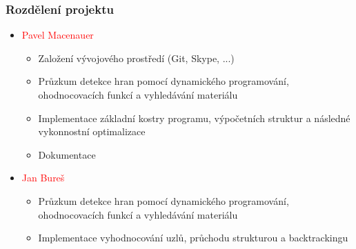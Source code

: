 \documentclass{beamer}
\begin{document}
	
	\begin{frame}[t,fragile]
		\frametitle{Rozdělení projektu}	

		\begin{itemize}
			\item \textcolor{red}{Pavel Macenauer}
			\begin{itemize}
				\item Založení vývojového prostředí (Git, Skype, ...)
				\item Průzkum detekce hran pomocí dynamického programování, ohodnocovacích funkcí a vyhledávání materiálu
				\item Implementace základní kostry programu, výpočetních struktur a následné vykonnostní optimalizace
				\item Dokumentace
			\end{itemize}
			\item \textcolor{red}{Jan Bureš}
			\begin{itemize}							
				\item Průzkum detekce hran pomocí dynamického programování, ohodnocovacích funkcí a vyhledávání materiálu
				\item Implementace vyhodnocování uzlů, průchodu strukturou a backtrackingu
			\end{itemize}
		\end{itemize}
		
	\end{frame}
	
\end{document}

